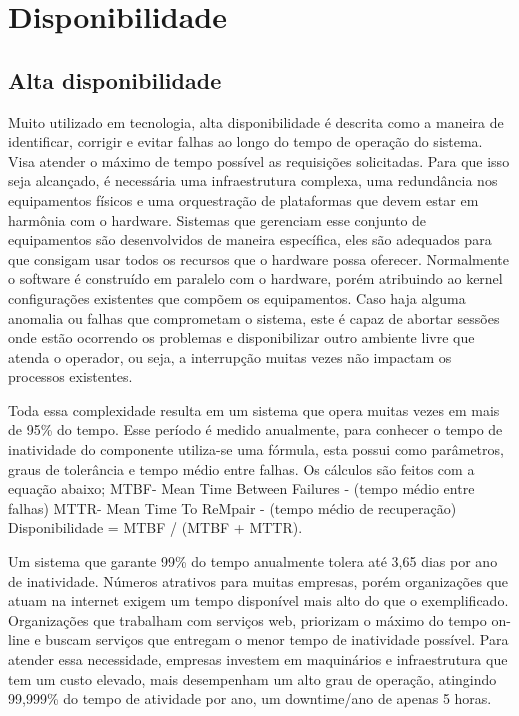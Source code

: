 \chapter{Disponibilidade}

\section{Alta disponibilidade}

Muito utilizado em tecnologia, alta disponibilidade é descrita como a maneira de identificar, corrigir e evitar falhas ao longo do tempo de operação do sistema. Visa atender o máximo de tempo possível as requisições solicitadas. Para que isso seja alcançado, é necessária uma infraestrutura complexa, uma redundância nos equipamentos físicos e uma orquestração de plataformas que devem estar em harmônia com o hardware. Sistemas que gerenciam esse conjunto de equipamentos são desenvolvidos de maneira específica, eles são adequados para que consigam usar todos os recursos que o hardware possa oferecer. Normalmente o software é construído em paralelo com o hardware, porém atribuindo ao kernel configurações existentes que compõem os equipamentos.
Caso haja alguma anomalia ou falhas que comprometam o sistema, este é capaz de abortar sessões onde estão ocorrendo os problemas e disponibilizar outro ambiente livre que atenda o operador, ou seja, a interrupção muitas vezes não impactam os processos existentes.


Toda essa complexidade resulta em um sistema que opera muitas vezes em mais de 95\% do tempo. Esse período é medido anualmente, para conhecer o tempo de inatividade do componente utiliza-se uma fórmula, esta possui como parâmetros, graus de tolerância e tempo médio entre falhas. Os cálculos são feitos com a equação abaixo;
MTBF- Mean Time Between Failures - (tempo médio entre falhas)
MTTR- Mean Time To ReMpair - (tempo médio de recuperação)
Disponibilidade = MTBF / (MTBF + MTTR).


Um sistema que garante 99\% do tempo anualmente tolera até 3,65 dias por ano de inatividade. Números atrativos para muitas empresas, porém organizações que atuam na internet exigem um tempo disponível mais alto do que o exemplificado. Organizações que trabalham com serviços web, priorizam o máximo do tempo on-line e buscam serviços que entregam o menor tempo de inatividade possível. Para atender essa necessidade, empresas investem em maquinários e infraestrutura que tem um custo elevado, mais desempenham um alto grau de operação, atingindo 99,999\% do tempo de atividade por ano, um downtime/ano de apenas 5 horas.


